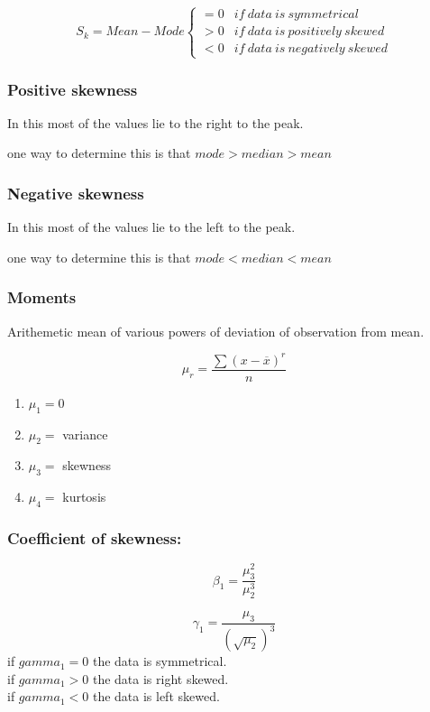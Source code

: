 \documentclass[11pt,letterpaper]{article}
\begin{document}
\[
  S_k = Mean - Mode
  \begin{cases}
    = 0 & if\ data\ is\ symmetrical\\
    > 0 & if\ data\ is\ positively\ skewed\\
    < 0 & if\ data\ is\ negatively\ skewed
  \end{cases}
\]

\subsubsection{Positive skewness}
In this most of the values lie to the right to the peak. 

one way to determine this is that $mode > median > mean$ 


\subsubsection{Negative skewness}
In this most of the values lie to the left to the peak. 

one way to determine this is that $mode < median < mean$ 

\subsubsection{Moments}
Arithemetic mean of various powers of deviation of observation from mean. 

\[
  \mu_r = \frac{\sum(x-\overline{x})^r}{n}
\]

\begin{enumerate}
  \item $\mu_1 = 0$
  \item $\mu_2 = $ variance
  \item $\mu_3 = $ skewness
  \item $\mu_4 = $ kurtosis
\end{enumerate}

\subsubsection{Coefficient of skewness:}
\[
  \beta_1 = \frac{\mu_3^2}{\mu_2^3}
\]

\[
  \gamma_1 = \frac{\mu_3}{(\sqrt{\mu_2})^3}
\]
if $gamma_1 = 0$ the data is symmetrical. \\
if $gamma_1 > 0$ the data is right skewed. \\
if $gamma_1 < 0$ the data is left skewed. \\
\end{document}
